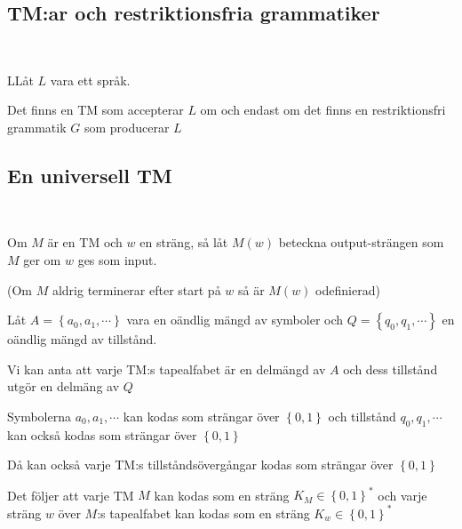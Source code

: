 \subsection{TM:ar och restriktionsfria grammatiker}\hfill\\\par
\begin{theo}
  LLåt $L$ vara ett språk.\par
  \noindent Det finns en TM som accepterar $L$ om och endast om det finns en restriktionsfri grammatik $G$ som producerar $L$
\end{theo}
\par\bigskip
\subsection{En universell TM}\hfill\\\par
\noindent Om $M$ är en TM och $w$ en sträng, så låt $M(w)$ beteckna output-strängen som $M$ ger om $w$ ges som input.\par
\noindent (Om $M$ aldrig terminerar efter start på $w$ så är $M(w)$ odefinierad)
\par\bigskip
\noindent Låt $A= \left\{a_0,a_1,\cdots\right\}$ vara en oändlig mängd av symboler och $Q = \left\{q_0,q_1,\cdots\right\}$ en oändlig mängd av tillstånd.\par
\noindent Vi kan anta att varje TM:s tapealfabet är en delmängd av $A$ och dess tillstånd utgör en delmäng av $Q$
\par\bigskip
\noindent Symbolerna $a_0,a_1,\cdots$ kan kodas som strängar över $\left\{0,1\right\}$ och tillstånd $q_0,q_1,\cdots$ kan också kodas som strängar över $\left\{0,1\right\}$
\par\bigskip
\noindent Då kan också varje TM:s tillståndsövergångar kodas som strängar över $\left\{0,1\right\}$
\par\bigskip
\noindent Det följer att varje TM $M$ kan kodas som en sträng $K_M\in\left\{0,1\right\}^*$ och varje sträng $w$ över $M$:s tapealfabet kan kodas som en sträng $K_w\in\left\{0,1\right\}^*$
\par\bigskip
